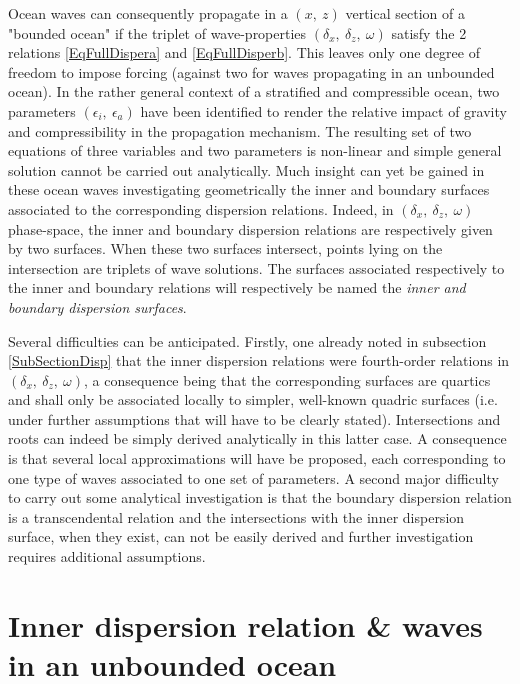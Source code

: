 \documentclass[a4paper,11pt]{article}
\begin{document}
Ocean waves can consequently propagate in a $(x,\ z)$ vertical section of a "bounded ocean" if the triplet of wave-properties $(\delta_x,\ \delta_z,\ \omega)$ satisfy the 2 relations \ref{EqFullDispera} and \ref{EqFullDisperb}. This leaves only one degree of freedom to impose forcing (against two for waves propagating in an unbounded ocean). In the rather general context of a stratified and compressible ocean, two parameters $(\epsilon_i,\ \epsilon_a)$ have been identified to render the relative impact of gravity and compressibility in the propagation mechanism. The resulting set of two equations of three variables and two parameters is non-linear and simple general solution cannot be carried out analytically. Much insight can yet be gained in these ocean waves investigating geometrically the inner and boundary surfaces associated to the corresponding dispersion relations. 
Indeed, in $(\delta_x,\  \delta_z,\ \omega)$ phase-space, the inner and boundary dispersion relations are respectively given by two surfaces. When these two surfaces intersect, points lying on the intersection are triplets of wave solutions. The surfaces associated respectively to the inner and boundary relations will respectively be named the \textit{inner and boundary dispersion surfaces}.

Several difficulties can be anticipated. Firstly, one already noted in subsection \ref{SubSectionDisp} that the inner dispersion relations were fourth-order relations in $(\delta_x,\ \delta_z,\ \omega)$, a consequence being that the corresponding surfaces are quartics and shall only be associated locally to simpler, well-known quadric surfaces (i.e. under further assumptions that will have to be clearly stated). Intersections and roots can indeed be simply derived analytically in this latter case. A consequence is that several local approximations will have be proposed, each corresponding to one type of waves associated to one set of parameters. A second major difficulty to carry out some analytical investigation is that the boundary dispersion relation is a transcendental relation and the intersections with the inner dispersion surface, when they exist, can not be easily derived and further investigation  requires additional assumptions.\\

\newpage
\section{Inner dispersion relation \& waves in an unbounded ocean}
\label{SectionInner}
\end{document}
